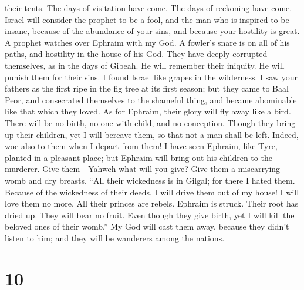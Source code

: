 their tents.  The days of visitation have come. The days
of reckoning have come. Israel will consider the prophet to be a fool,
and the man who is inspired to be insane, because of the abundance of
your sins, and because your hostility is great.  A prophet
watches over Ephraim with my God. A fowler's snare is on all of his
paths, and hostility in the house of his God.  They have
deeply corrupted themselves, as in the days of Gibeah. He will remember
their iniquity. He will punish them for their sins.  I
found Israel like grapes in the wilderness. I saw your fathers as the
first ripe in the fig tree at its first season; but they came to Baal
Peor, and consecrated themselves to the shameful thing, and became
abominable like that which they loved.  As for Ephraim,
their glory will fly away like a bird. There will be no birth, no one
with child, and no conception.  Though they bring up
their children, yet I will bereave them, so that not a man shall be
left. Indeed, woe also to them when I depart from them! 
I have seen Ephraim, like Tyre, planted in a pleasant place; but Ephraim
will bring out his children to the murderer.  Give
them---Yahweh what will you give? Give them a miscarrying womb and dry
breasts.  ``All their wickedness is in Gilgal; for there
I hated them. Because of the wickedness of their deeds, I will drive
them out of my house! I will love them no more. All their princes are
rebels.  Ephraim is struck. Their root has dried up. They
will bear no fruit. Even though they give birth, yet I will kill the
beloved ones of their womb.''  My God will cast them
away, because they didn't listen to him; and they will be wanderers
among the nations.

\hypertarget{section-5}{%
\section{10}\label{section-5}}


